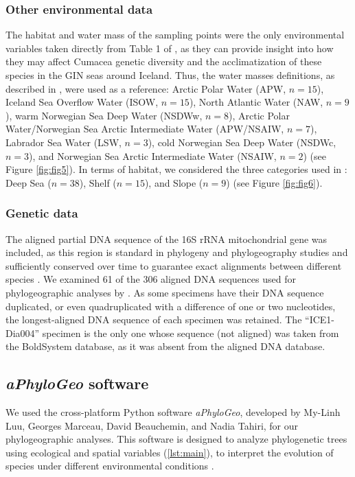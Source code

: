 {\subsubsection{Other environmental data}
The habitat and water mass of the sampling points were the only environmental variables taken directly from Table 1 of \citep{uhlir_adding_2021}, as they can provide insight into how they may affect Cumacea genetic diversity and the acclimatization of these species in the GIN seas around Iceland. Thus, the water masses definitions, as described in \citep{uhlir_adding_2021}, were used as a reference: Arctic Polar Water (APW, $n=15$), Iceland Sea Overflow Water (ISOW, $n=15$), North Atlantic Water (NAW, $n=9$), warm Norwegian Sea Deep Water (NSDWw, $n=8$), Arctic Polar Water/Norwegian Sea Arctic Intermediate Water (APW/NSAIW, $n=7$), Labrador Sea Water (LSW, $n=3$), cold Norwegian Sea Deep Water (NSDWc, $n=3$), and Norwegian Sea Arctic Intermediate Water (NSAIW, $n=2$) (see Figure \ref{fig:fig5}). In terms of habitat, we considered the three categories used in \citep{uhlir_adding_2021}: Deep Sea ($n=38$), Shelf ($n=15$), and Slope ($n=9$) (see Figure \ref{fig:fig6}).

\subsubsection{Genetic data}
The aligned partial DNA sequence of the 16S rRNA mitochondrial gene was included, as this region is standard in phylogeny and phylogeography studies \citep{hugenholtz1998impact} and sufficiently conserved over time to guarantee exact alignments between different species \citep{saccone1999evolutionary}. We examined 61 of the 306 aligned DNA sequences used for phylogeographic analyses by \citep{uhlir_adding_2021}. As some specimens have their DNA sequence duplicated, or even quadruplicated with a difference of one or two nucleotides, the longest-aligned DNA sequence of each specimen was retained. The ``ICE1-Dia004'' specimen is the only one whose sequence (not aligned) was taken from the BoldSystem database, as it was absent from the \citep{uhlir_adding_2021} aligned DNA database.

\subsection{{\textit{aPhyloGeo} software}\label{aPhyloGeo-software}}
We used the cross-platform Python software \textit{aPhyloGeo}, developed by My-Linh Luu, Georges Marceau, David Beauchemin, and Nadia Tahiri, for our phylogeographic analyses. This software is designed to analyze phylogenetic trees using ecological and spatial variables (\autoref{lst:main}), to interpret the evolution of species under different environmental conditions \citep{koshkarov_phylogeography_2022}.

}
